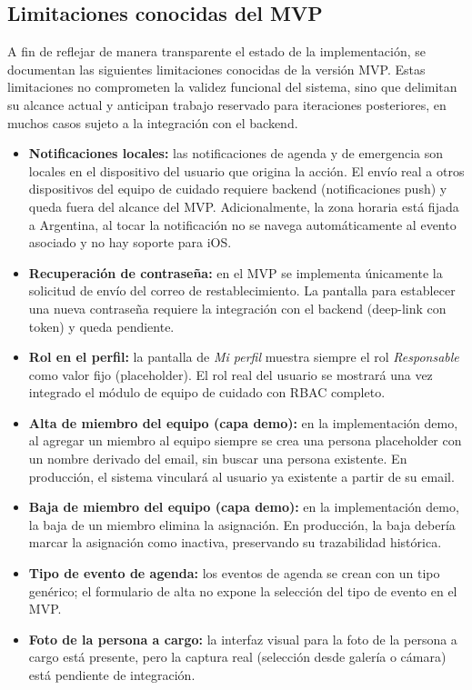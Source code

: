 \documentclass[a4paper,12pt]{article}
\begin{document}
    \subsection{Limitaciones conocidas del MVP}
    \par A fin de reflejar de manera transparente el estado de la implementación, se documentan las siguientes limitaciones conocidas de la versión MVP. Estas limitaciones no comprometen la validez funcional del sistema, sino que delimitan su alcance actual y anticipan trabajo reservado para iteraciones posteriores, en muchos casos sujeto a la integración con el backend.
    \begin{itemize}
        \item \textbf{Notificaciones locales:} las notificaciones de agenda y de emergencia son locales en el dispositivo del usuario que origina la acción. El envío real a otros dispositivos del equipo de cuidado requiere backend (notificaciones push) y queda fuera del alcance del MVP. Adicionalmente, la zona horaria está fijada a Argentina, al tocar la notificación no se navega automáticamente al evento asociado y no hay soporte para iOS.
        \item \textbf{Recuperación de contraseña:} en el MVP se implementa únicamente la solicitud de envío del correo de restablecimiento. La pantalla para establecer una nueva contraseña requiere la integración con el backend (deep-link con token) y queda pendiente.
        \item \textbf{Rol en el perfil:} la pantalla de \textit{Mi perfil} muestra siempre el rol \textit{Responsable} como valor fijo (placeholder). El rol real del usuario se mostrará una vez integrado el módulo de equipo de cuidado con RBAC completo.
        \item \textbf{Alta de miembro del equipo (capa demo):} en la implementación demo, al agregar un miembro al equipo siempre se crea una persona placeholder con un nombre derivado del email, sin buscar una persona existente. En producción, el sistema vinculará al usuario ya existente a partir de su email.
        \item \textbf{Baja de miembro del equipo (capa demo):} en la implementación demo, la baja de un miembro elimina la asignación. En producción, la baja debería marcar la asignación como inactiva, preservando su trazabilidad histórica.
        \item \textbf{Tipo de evento de agenda:} los eventos de agenda se crean con un tipo genérico; el formulario de alta no expone la selección del tipo de evento en el MVP.
        \item \textbf{Foto de la persona a cargo:} la interfaz visual para la foto de la persona a cargo está presente, pero la captura real (selección desde galería o cámara) está pendiente de integración.
    \end{itemize}
\end{document}
